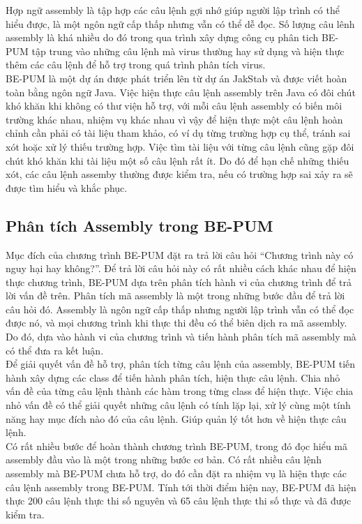 Hợp ngữ assembly là tập hợp các câu lệnh gợi nhớ giúp người lập trình có thể hiểu được, là một ngôn ngữ cấp thấp nhưng vẫn có thể dễ đọc. Số lượng câu lênh assembly là khá nhiều do đó trong qua trình xây dựng công cụ phân tich BE-PUM tập trung vào những câu lệnh mà virus thường hay sử dụng và hiện thực thêm các câu lệnh để hỗ trợ trong quá trình phân tích virus.\\

BE-PUM là một dự án được phát triển lên từ dự án JakStab và được viết hoàn toàn bằng ngôn ngữ Java. Việc hiện thực câu lệnh assembly trên Java có đôi chút khó khăn khi không có thư viện hỗ trợ, với mỗi câu lệnh assembly có biến môi trường khác nhau, nhiệm vụ khác nhau vì vậy để hiện thực một câu lệnh hoàn chỉnh cần phải có tài liệu tham khảo, có ví dụ từng trường hợp cụ thể, tránh sai xót hoặc xử lý thiếu trường hợp. Việc tìm tài liệu với từng câu lệnh cũng gặp đôi chút khó khăn khi tài liệu một số câu lệnh rất ít. Do đó để hạn chế những thiếu xót, các câu lệnh assemby thường được kiểm tra, nếu có trường hợp sai xảy ra sẽ được tìm hiểu và khắc phục.

  \subsection{Phân tích Assembly trong BE-PUM}
  Mục đích của chương trình BE-PUM đặt ra trả lời câu hỏi “Chương trình này có nguy hại hay không?”. Để trả lời câu hỏi này có rất nhiều cách khác nhau để hiện thực chương trình, BE-PUM dựa trên phân tích hành vi của chương trình để trả lời vấn đề trên. Phân tích mã assembly là một trong những bước đầu để trả lời câu hỏi đó. Assembly là ngôn ngữ cấp thấp nhưng người lập trình vẫn có thể đọc được nó, và mọi chương trình khi thực thi đều có thể biên dịch ra mã assembly. Do đó, dựa vào hành vi của chương trình và tiến hành phân tích mã assembly mà có thể đưa ra kết luận.\\

Để giải quyết vấn đề hỗ trợ, phân tích từng câu lệnh của assembly, BE-PUM tiến hành xây dựng các class để tiến hành phân tích, hiện thực câu lệnh. Chia nhỏ vấn đề của từng câu lệnh thành các hàm trong từng class để hiện thực. Việc chia nhỏ vấn đề có thể giải quyết những câu lệnh có tính lặp lại, xử lý cùng một tính năng hay mục đích nào đó của câu lệnh. Giúp quản lý tốt hơn về hiện thực câu lệnh.\\

Có rất nhiều bước để hoàn thành chương trình BE-PUM, trong đó đọc hiểu mã assembly đầu vào là một trong những bước cơ bản. Có rất nhiều câu lệnh assembly mà BE-PUM chưa hỗ trợ, do đó cần đặt ra nhiệm vụ là hiện thực các câu lệnh assembly trong BE-PUM. Tính tới thời điểm hiện nay, BE-PUM đã hiện thực 200 câu lệnh thực thi số nguyên và 65 câu lệnh thực thi số thực và đã được kiểm tra. 

